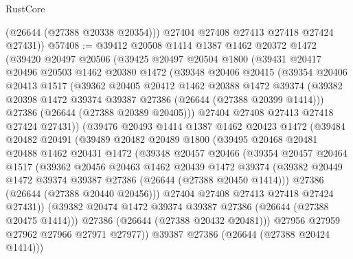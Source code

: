 \begin{lexlean}{RustCore}
\begin{coremodule}
          (@26644 (@27388 @20338 @20354)))
        @27404
        @27408
        @27413
        @27418
        @27424
        @27431))
@57408 := @39412
    @20508
    @1414
    @1387
    @1462
    @20372
    @1472
    (@39420
      @20497
      @20506
      (@39425
        @20497
        @20504
        @1800
        (@39431
          @20417
          @20496
          @20503
          @1462
          @20380
          @1472
          (@39348
            @20406
            @20415
            (@39354
              @20406
              @20413
              @1517
              (@39362
                @20405
                @20412
                @1462
                @20388
                @1472
                @39374
                (@39382 @20398 @1472 @39374 @39387 @27386 (@26644 (@27388 @20399 @1414)))
                @27386
                (@26644 (@27388 @20389 @20405)))
              @27404
              @27408
              @27413
              @27418
              @27424
              @27431))
          (@39476
            @20493
            @1414
            @1387
            @1462
            @20423
            @1472
            (@39484
              @20482
              @20491
              (@39489
                @20482
                @20489
                @1800
                (@39495
                  @20468
                  @20481
                  @20488
                  @1462
                  @20431
                  @1472
                  (@39348
                    @20457
                    @20466
                    (@39354
                      @20457
                      @20464
                      @1517
                      (@39362
                        @20456
                        @20463
                        @1462
                        @20439
                        @1472
                        @39374
                        (@39382 @20449 @1472 @39374 @39387 @27386 (@26644 (@27388 @20450 @1414)))
                        @27386
                        (@26644 (@27388 @20440 @20456)))
                      @27404
                      @27408
                      @27413
                      @27418
                      @27424
                      @27431))
                  (@39382 @20474 @1472 @39374 @39387 @27386 (@26644 (@27388 @20475 @1414)))
                  @27386
                  (@26644 (@27388 @20432 @20481)))
                @27956
                @27959
                @27962
                @27966
                @27971
                @27977))
            @39387
            @27386
            (@26644 (@27388 @20424 @1414)))

\end{coremodule}
\end{lexlean}

